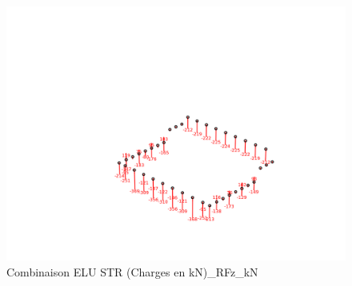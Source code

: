     \begin{figure}[H] %
        \centering %
        \includegraphics[width=\textwidth]{assets/img/graph3D_charges_cas_10_RFz_kN.png} %
        \caption{Combinaison ELU STR (Charges en kN)\_RFz\_kN} %
    \end{figure}

    